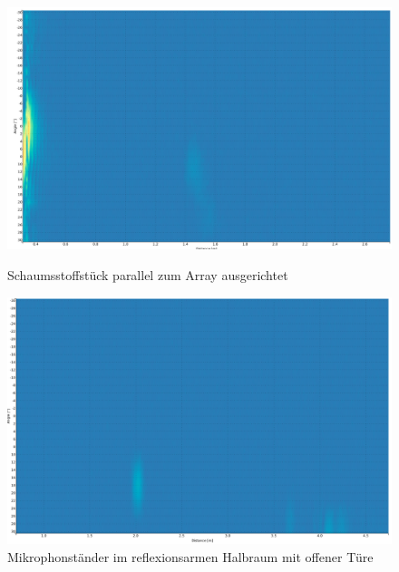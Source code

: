 \clearpage
\begin{figure}[htb]
\begin{minipage}{1.0\textwidth}
\includegraphics[width=\textwidth]{graphics/image_test_obj_schaumstoff_20deg_1.png}
\caption{Schaumsstoffstück parallel zum Array ausgerichtet} %
\label{fig:image_test_obj_schaumstoff_20deg_1}
%
\end{minipage}
\begin{minipage}{1.0\textwidth}
\includegraphics[width=\textwidth]{graphics/image_test_obj_mikrophonstaender.png}
\caption{Mikrophonständer im reflexionsarmen Halbraum mit offener Türe} %
\label{fig:image_test_obj_mikrophonstaender}
%
\end{minipage}
\end{figure}
